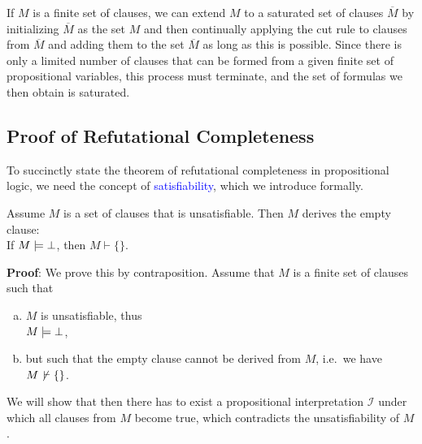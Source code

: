 \remarkEng
If $M$ is a finite set of clauses, we can extend $M$ to a saturated set of clauses
$\overline{M}$ by initializing $\overline{M}$ as the set $M$ and then continually applying the
cut rule to clauses from $\overline{M}$ and adding them to the set $\overline{M}$ as long as this is possible.
Since there is only a limited number of clauses that can be formed from a given finite set of propositional variables,
this process must terminate, and the set of formulas we then obtain is saturated. \eox

\subsection{Proof of Refutational Completeness}
To succinctly state the theorem of refutational completeness in propositional logic, we need the concept of
\textcolor{blue}{satisfiability}, which we introduce formally. 

\begin{Satz}[\textcolor{blue}{Refutation Completeness}] \label{widerlegungs-vollstaendig} \hspace*{\fill} \linebreak
  Assume $M$ is a set of clauses that is unsatisfiable.  Then $M$ derives the empty clause:
  \\[0.2cm]
  \hspace*{1.3cm} 
  If $M \models \bot$, then $M \vdash \{\}$.
\end{Satz}

\noindent
\textbf{Proof}: We prove this by contraposition. Assume that $M$ is a finite set of clauses such that
\begin{enumerate}[(a)]
\item $M$ is unsatisfiable, thus
      \\[0.2cm]
      \hspace*{1.3cm}
      $M \models \bot$,
\item but such that the empty clause cannot be derived from $M$, i.e.~we have
      \\[0.2cm]
      \hspace*{1.3cm}
      $M \not\,\vdash \{\}$.
\end{enumerate}
We will show that then there has to exist a propositional interpretation $\mathcal{I}$ under which all clauses
from $M$ become true, which contradicts the unsatisfiability of $M$. 


